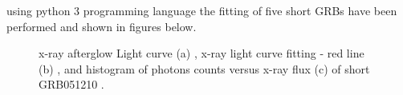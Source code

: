 using python 3 programming language the fitting of five short GRBs have been performed and shown in figures below.
\begin{figure}[hpbt]
\caption{x-ray  afterglow Light curve (a) , x-ray  light curve fitting - red line (b) , and histogram  of  photons counts  versus x-ray flux  (c)  of short GRB051210 .}
\end{figure}
